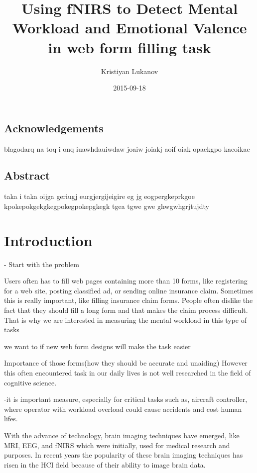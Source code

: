 \documentclass[a4paper]{report}
\title{Using fNIRS to Detect Mental Workload and Emotional Valence in web form filling task}
\date{2015-09-18}
\author{Kristiyan Lukanov}
\begin{document}
	\maketitle
	\newpage
	
	\section*{Acknowledgements}
	blagodarq na toq i onq iuawhdauiwdaw joaiw joiakj aoif oiak opaekgpo kaeoikae 
	\newpage
	
	\section*{Abstract}
	taka i taka  oijga geriugj eurgjergijeigire eg jg eogpergkeprkgoe kpokepokgekgkegpokegpokepgkegk tgea tgwe gwe ghwgwhgrjtujdty
	\newpage
	\tableofcontents
	\newpage
	
	\chapter{Introduction}
	- Start with the problem
	
	Users often has to fill web pages containing more than 10 forms, like registering for a web site, posting classified ad, or sending online insurance claim. Sometimes this is really important, like filling insurance claim forms. People often dislike the fact that they should fill a long form and that makes the claim process difficult. That is why we are interested in measuring the mental workload in this type of tasks
	
	we want to if new web form designs will make the task easier
	
	
	Importance of those forms(how they should be accurate and unaiding)
	 However this often encountered task in our daily lives is not well researched in the field of cognitive science.	
	
	 -it is important measure, especially for critical tasks such as, aircraft controller, where operator with workload overload could cause accidents and cost human lifes.
	
	With the advance of technology, brain imaging techniques have emerged, like MRI, EEG, and fNIRS which were initially, used for medical research and purposes. In recent years the popularity of these brain imaging techniques has risen in the HCI field because of their ability to image brain data.
	
\end{document}
